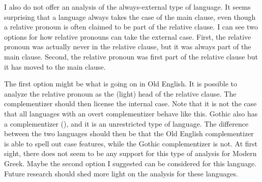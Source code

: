 I also do not offer an analysis of the always-external type of language. It seems surprising that a language always takes the case of the main clause, even though a relative pronoun is often claimed to be part of the relative clause. I can see two options for how relative pronouns can take the external case. First, the relative pronoun was actually never in the relative clause, but it was always part of the main clause. Second, the relative pronoun was first part of the relative clause but it has moved to the main clause.

The first option might be what is going on in Old English. It is possible to analyze the relative pronoun as the (light) head of the relative clause. The complementizer  should then license the internal case. Note that it is not the case that all languages with an overt complementizer behave like this. Gothic also has a complementizer (), and it is an unrestricted type of language. The difference between the two languages should then be that the Old English complementizer is able to spell out case features, while the Gothic complementizer is not.
At first sight, there does not seem to be any support for this type of analysis for Modern Greek. Maybe the second option I suggested can be considered for this language. Future research should shed more light on the analysis for these languages.
